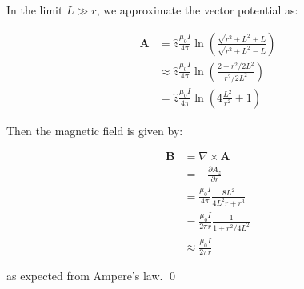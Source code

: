\documentclass[12pt]{article}
\begin{document}
In the limit $L \gg r$, we approximate the vector potential as:

\begin{equation}
\begin{split}
    \mathbf{A} &= \hat{z} \frac{\mu_{0} I}{4\pi} \ln{\left( \frac{\sqrt{r^{2} + L^{2}} + L}{\sqrt{r^{2} + L^{2}} - L} \right)} \\
    &\approx \hat{z} \frac{\mu_{0} I}{4\pi} \ln{\left( \frac{2 + r^{2}/2L^{2}}{r^{2}/2L^{2}} \right)} \\
    &= \hat{z} \frac{\mu_{0} I}{4\pi} \ln{\left( 4\frac{L^{2}}{r^{2}} + 1 \right)}
\end{split}
\end{equation}

Then the magnetic field is given by:

\begin{equation}
\begin{split}
    \mathbf{B} &= \nabla \times \mathbf{A} \\
    &= -\frac{\partial A_{z}}{\partial r} \\
    &= \frac{\mu_{0} I}{4\pi} \frac{8L^{2}}{4L^{2}r + r^{3}} \\
    &= \frac{\mu_{0} I}{2\pi r} \frac{1}{1 + r^{2}/4L^{2}} \\
    &\approx \frac{\mu_{0} I}{2\pi r}
\end{split}
\end{equation}

as expected from Ampere's law.
\qed
\end{document}
